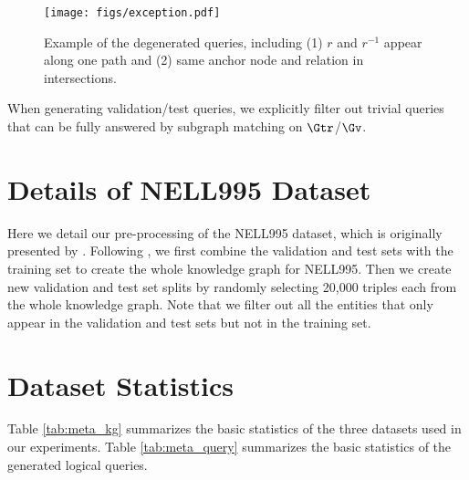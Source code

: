 \begin{figure*}[t]
\label{fig:exception}
\centering
    \texttt{[image: figs/exception.pdf]}
    \caption{Example of the degenerated queries, including (1) $r$ and $r^{-1}$ appear along one path and (2) same anchor node and relation in intersections.}
\end{figure*}

When generating validation/test queries, we explicitly filter out trivial queries that can be fully answered by subgraph matching on $\Gtr$/$\Gv$.
 


\section{Details of NELL995 Dataset} \label{app:nell}
Here we detail our pre-processing of the NELL995 dataset, which is originally presented by \citet{xiong2017deeppath}. 
Following \citet{allen2019understanding}, we first combine the validation and test sets with the training set to create the whole knowledge graph for NELL995. Then we create new validation and test set splits by randomly selecting 20,000 triples each from the whole knowledge graph. Note that we filter out all the entities that only appear in the validation and test sets but not in the training set. 

\newpage
\section{Dataset Statistics} \label{app:datastats}
Table \ref{tab:meta_kg} summarizes the basic statistics of the three datasets used in our experiments. Table \ref{tab:meta_query} summarizes the basic statistics of the generated logical queries.

\begin{table*}[t]
\centering
\small
{}
\caption{Knowledge graph dataset statistics as well as the split into training, validation, and test sets.}
\label{tab:meta_kg}
\end{table*}

